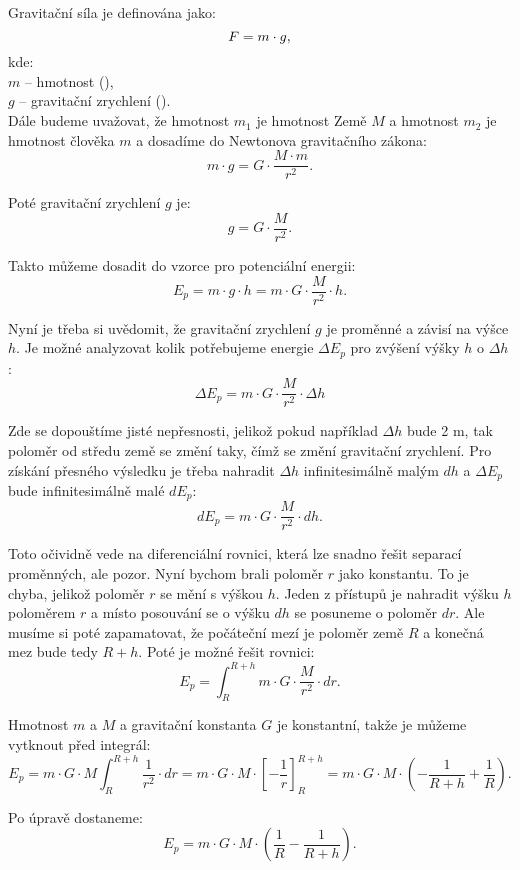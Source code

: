 \documentclass{article}
\begin{document}
Gravitační síla je definována jako:
\begin{equation}
    F = m \cdot g,
    \unit{(\ueqN)}
\end{equation}
kde:\\
$m$ -- hmotnost (\ueqKG),\\
$g$ -- gravitační zrychlení (\ueqMandSinvsq).\\

Dále budeme uvažovat, že hmotnost $m_1$ je hmotnost Země $M$ a hmotnost $m_2$ je hmotnost člověka $m$ a dosadíme do Newtonova gravitačního zákona:
$$
    m \cdot g = G \cdot \frac{M \cdot m}{r^2}.
$$

Poté gravitační zrychlení $g$ je:
$$
    g = G \cdot \frac{M}{r^2}.
$$

Takto můžeme dosadit do vzorce pro potenciální energii:
$$
    E_p = m \cdot g \cdot h = m \cdot G \cdot \frac{M}{r^2} \cdot h.
$$

Nyní je třeba si uvědomit, že gravitační zrychlení $g$ je proměnné a závisí na výšce $h$. Je možné analyzovat kolik potřebujeme energie $\Delta E_p$ pro zvýšení výšky $h$ o $\Delta h$:
$$
    \Delta E_p = m \cdot G \cdot \frac{M}{r^2} \cdot \Delta h
$$

Zde se dopouštíme jisté nepřesnosti, jelikož pokud například $\Delta h$ bude 2 m, tak poloměr od středu země se změní taky, čímž se změní gravitační zrychlení. Pro získání přesného výsledku je třeba nahradit $\Delta h$ infinitesimálně malým $dh$ a $\Delta E_p$ bude infinitesimálně malé $dE_p$:
$$
    dE_p = m \cdot G \cdot \frac{M}{r^2} \cdot dh.
$$

Toto očividně vede na diferenciální rovnici, která lze snadno řešit separací proměnných, ale pozor. Nyní bychom brali poloměr $r$ jako konstantu. To je chyba, jelikož poloměr $r$ se mění s výškou $h$. Jeden z přístupů je nahradit výšku $h$ poloměrem $r$ a místo posouvání se o výšku $dh$ se posuneme o poloměr $dr$. Ale musíme si poté zapamatovat, že počáteční mezí je poloměr země $R$ a konečná mez bude tedy $R + h$. Poté je možné řešit rovnici:
$$
    E_p = \int_{R}^{R + h} m \cdot G \cdot \frac{M}{r^2} \cdot dr.
$$

Hmotnost $m$ a $M$ a gravitační konstanta $G$ je konstantní, takže je můžeme vytknout před integrál:
$$
    E_p = m \cdot G \cdot M \int_{R}^{R + h} \frac{1}{r^2} \cdot dr = m \cdot G \cdot M \cdot \left[ - \frac{1}{r} \right]_{R}^{R + h} = m \cdot G \cdot M \cdot \left( - \frac{1}{R + h} + \frac{1}{R} \right).
$$

Po úpravě dostaneme:
$$
    E_p = m \cdot G \cdot M \cdot \left( \frac{1}{R} - \frac{1}{R + h} \right).
$$
\end{document}
